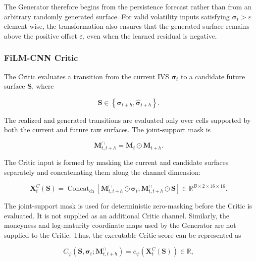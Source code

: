 The Generator therefore begins from the persistence forecast rather than from
an arbitrary randomly generated surface. For valid volatility inputs satisfying
$\boldsymbol{\sigma}_t>\varepsilon$ element-wise, the transformation also
ensures that the generated surface remains above the positive offset
$\varepsilon$, even when the learned residual is negative.






\subsubsection*{FiLM-CNN Critic}

The Critic evaluates a transition from the current IVS
$\boldsymbol{\sigma}_t$ to a candidate future surface $\mathbf{S}$, where

\begin{equation}
\mathbf{S}
\in
\left\{
\boldsymbol{\sigma}_{t+h},
\widehat{\boldsymbol{\sigma}}_{t+h}
\right\}.
\end{equation}

The realized and generated transitions are evaluated only over cells supported
by both the current and future raw surfaces. The joint-support mask is

\begin{equation}\label{eq:ch3:critic_joint_support_mask}
\mathbf{M}^{\cap}_{t,t+h}
=
\mathbf{M}_t
\odot
\mathbf{M}_{t+h}.
\end{equation}

The Critic input is formed by masking the current and candidate surfaces
separately and concatenating them along the channel dimension:

\begin{equation}\label{eq:ch3:nolp_critic_input}
\mathbf{X}^{C}_t(\mathbf{S})
=
\operatorname{Concat}_{\mathrm{ch}}
\left[
\mathbf{M}^{\cap}_{t,t+h}
\odot
\boldsymbol{\sigma}_t;
\mathbf{M}^{\cap}_{t,t+h}
\odot
\mathbf{S}
\right]
\in
\mathbb{R}^{B\times2\times16\times16}.
\end{equation}

The joint-support mask is used for deterministic zero-masking before the
Critic is evaluated. It is not supplied as an additional Critic channel.
Similarly, the moneyness and log-maturity coordinate maps used by the
Generator are not supplied to the Critic. Thus, the executable Critic score
can be represented as

\begin{equation}\label{eq:ch3:nolp_critic}
C_{\psi}
\left(
\mathbf{S},
\boldsymbol{\sigma}_t;
\mathbf{M}^{\cap}_{t,t+h}
\right)
=
c_{\psi}
\left(
\mathbf{X}^{C}_t(\mathbf{S})
\right)
\in\mathbb{R},
\end{equation}


